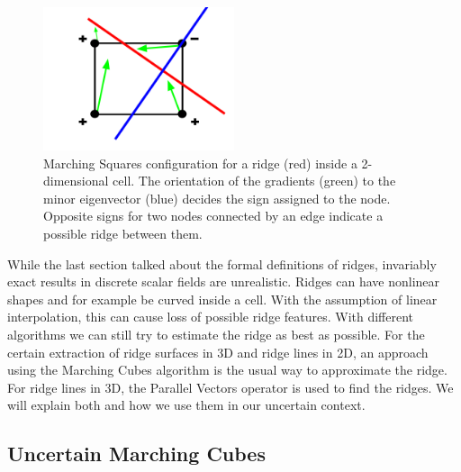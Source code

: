 \begin{figure}[t]
  \centering
  \includegraphics[width=0.5\textwidth]{Images/MC.pdf}
  \caption{Marching Squares configuration for a ridge (red) inside a
  2-dimensional cell. The orientation of the gradients (green) to the
  minor eigenvector (blue) decides the sign assigned to the node.
  Opposite signs for two nodes connected by an edge indicate a
  possible ridge between them.}
  \label{fig:MC}
\end{figure}

While the last section talked about the formal definitions of ridges,
invariably exact results in discrete scalar fields are unrealistic.
Ridges can have nonlinear shapes and for example be curved inside a
cell. With the assumption of linear interpolation, this can cause loss
of possible ridge features. With different algorithms we can still try
to estimate the ridge as best as possible. For the certain extraction of
ridge surfaces in 3D and ridge lines in 2D, an approach using the
Marching Cubes algorithm is the usual way to approximate the ridge. For
ridge lines in 3D, the Parallel Vectors operator is used to find the
ridges. We will explain both and how we use them in our uncertain
context.

\subsection{Uncertain Marching Cubes}

